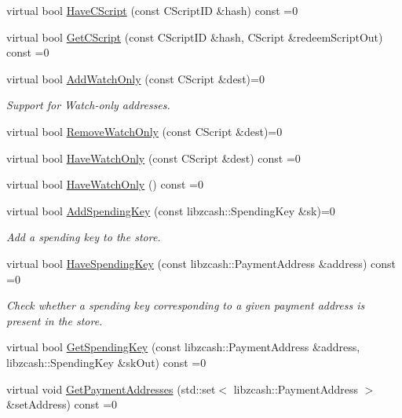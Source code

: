 \begin{DoxyCompactItemize}
virtual bool \mbox{\hyperlink{class_c_key_store_a51c9fc86b2c3fece10d86146231fa58d}{Have\+C\+Script}} (const C\+Script\+ID \&hash) const =0
\item 
virtual bool \mbox{\hyperlink{class_c_key_store_ae6bf4dbeb0705e199250e48aa5d34264}{Get\+C\+Script}} (const C\+Script\+ID \&hash, C\+Script \&redeem\+Script\+Out) const =0
\item 
virtual bool \mbox{\hyperlink{class_c_key_store_a12cd4eaa01bd4f4231c0bf68425a44af}{Add\+Watch\+Only}} (const C\+Script \&dest)=0
\begin{DoxyCompactList}\small\item\em Support for Watch-\/only addresses. \end{DoxyCompactList}\item 
virtual bool \mbox{\hyperlink{class_c_key_store_ad510747f28d129123a5200e4df8f7f61}{Remove\+Watch\+Only}} (const C\+Script \&dest)=0
\item 
virtual bool \mbox{\hyperlink{class_c_key_store_a15066cfd57feaffe0b9f4103c9311109}{Have\+Watch\+Only}} (const C\+Script \&dest) const =0
\item 
virtual bool \mbox{\hyperlink{class_c_key_store_a9169351f4acf62d299afb824174cbfa8}{Have\+Watch\+Only}} () const =0
\item 
virtual bool \mbox{\hyperlink{class_c_key_store_aa78189cb8f342a33570c2ac6d4a0ffcf}{Add\+Spending\+Key}} (const libzcash\+::\+Spending\+Key \&sk)=0
\begin{DoxyCompactList}\small\item\em Add a spending key to the store. \end{DoxyCompactList}\item 
virtual bool \mbox{\hyperlink{class_c_key_store_a15590101690f5a691b04a5498453b66a}{Have\+Spending\+Key}} (const libzcash\+::\+Payment\+Address \&address) const =0
\begin{DoxyCompactList}\small\item\em Check whether a spending key corresponding to a given payment address is present in the store. \end{DoxyCompactList}\item 
virtual bool \mbox{\hyperlink{class_c_key_store_a812534268d0324370c53ba3e7a295b95}{Get\+Spending\+Key}} (const libzcash\+::\+Payment\+Address \&address, libzcash\+::\+Spending\+Key \&sk\+Out) const =0
\item 
virtual void \mbox{\hyperlink{class_c_key_store_a6186d83956656316f3fe679b4f907866}{Get\+Payment\+Addresses}} (std\+::set$<$ libzcash\+::\+Payment\+Address $>$ \&set\+Address) const =0
\end{DoxyCompactItemize}
